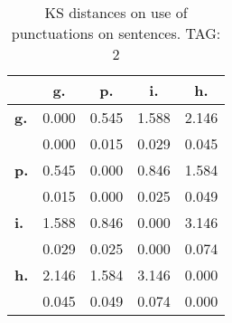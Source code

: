 \begin{table}[h!]
\begin{center}
\begin{tabular}{| l || c | c | c | c |}\hline
 & {\bf g.} & {\bf p.} & {\bf i.} & {\bf h.} \\\hline\hline
{\bf g.} & 0.000 & 0.545 & 1.588 & 2.146 \\
{\bf } & 0.000 & 0.015 & 0.029 & 0.045 \\\hline
{\bf p.} & 0.545 & 0.000 & 0.846 & 1.584 \\
{\bf } & 0.015 & 0.000 & 0.025 & 0.049 \\\hline
{\bf i.} & 1.588 & 0.846 & 0.000 & 3.146 \\
{\bf } & 0.029 & 0.025 & 0.000 & 0.074 \\\hline
{\bf h.} & 2.146 & 1.584 & 3.146 & 0.000 \\
{\bf } & 0.045 & 0.049 & 0.074 & 0.000 \\\hline
\end{tabular}
\caption{KS distances on use of punctuations on sentences. TAG: 2}
\end{center}
\end{table}